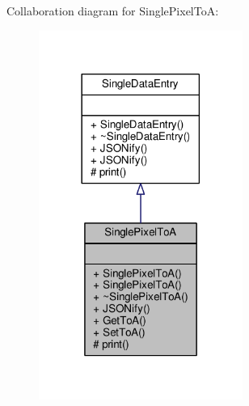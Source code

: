 Collaboration diagram for Single\+Pixel\+To\+A\+:\nopagebreak
\begin{figure}[H]
\begin{center}
\leavevmode
\includegraphics[width=189pt]{classSinglePixelToA__coll__graph}
\end{center}
\end{figure}
